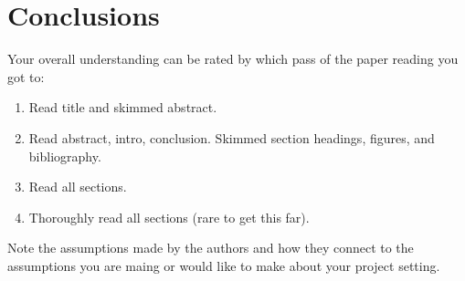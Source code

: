 \documentclass[oneside]{article} %
\begin{document}
 \section*{Conclusions}
 Your overall understanding can be rated by which pass of the paper reading you got to:
 \begin{enumerate}
 \item Read title and skimmed abstract.
 \item Read abstract, intro, conclusion. Skimmed section headings, figures, and bibliography.
 \item Read all sections.
 \item Thoroughly read all sections (rare to get this far).
 \end{enumerate}
 
 Note the assumptions made by the authors and how they connect to the assumptions you are maing or would like to make about your project setting.
 
\end{document}
